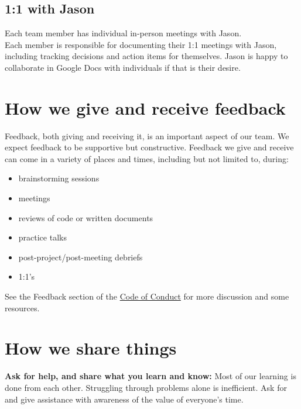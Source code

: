 \documentclass[
  letterpaper,
  DIV=11,
  numbers=noendperiod]{scrreprt}
\providecommand{\tightlist}{%
  \setlength{\itemsep}{0pt}\setlength{\parskip}{0pt}}\usepackage{longtable,booktabs,array}
\begin{document}
\subsection{1:1 with Jason}\label{meet-with-Jason}

Each team member has individual in-person meetings with Jason.\\
Each member is responsible for documenting their 1:1 meetings with
Jason, including tracking decisions and action items for themselves.
Jason is happy to collaborate in Google Docs with individuals if that is
their desire.

\section{How we give and receive
feedback}\label{how-we-give-and-receive-feedback}

Feedback, both giving and receiving it, is an important aspect of our
team. We expect feedback to be supportive but constructive. Feedback we
give and receive can come in a variety of places and times, including
but not limited to, during:

\begin{itemize}
\tightlist
\item
  brainstorming sessions\\
\item
  meetings\\
\item
  reviews of code or written documents\\
\item
  practice talks\\
\item
  post-project/post-meeting debriefs\\
\item
  1:1's
\end{itemize}

See the Feedback section of the \hyperref[code-of-conduct.qmd]{Code of
Conduct} for more discussion and some resources.

\section{How we share things}\label{how-we-share-things}

\textbf{Ask for help, and share what you learn and know:} Most of our
learning is done from each other. Struggling through problems alone is
inefficient. Ask for and give assistance with awareness of the value of
everyone's time.
\end{document}
